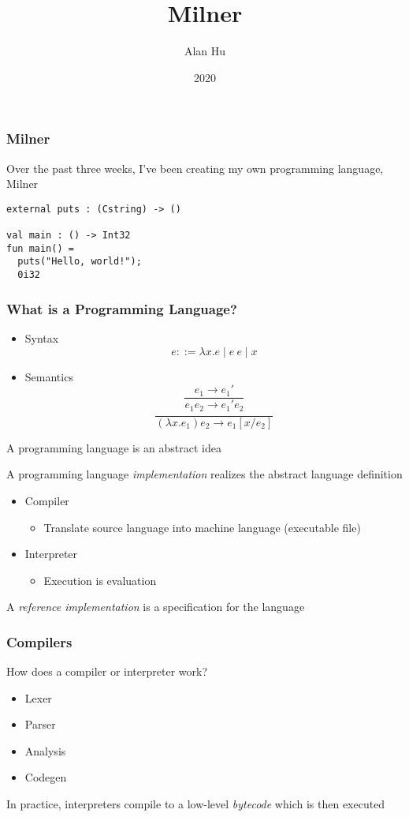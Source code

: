 \documentclass{beamer}
\title{Milner}
\author{Alan Hu}
\date{2020}
\begin{document}
\frame{\titlepage}

\begin{frame}[fragile]
  \frametitle{Milner}
  Over the past three weeks, I've been creating my own programming language,
  Milner

\begin{verbatim}
external puts : (Cstring) -> ()

val main : () -> Int32
fun main() =
  puts("Hello, world!");
  0i32
\end{verbatim}
\end{frame}

\begin{frame}
  \frametitle{What is a Programming Language?}
  \begin{itemize}
    \pause
  \item Syntax
    $$
    e ::= \lambda x.e \mid e \: e \mid x
    $$
    \pause
  \item Semantics
    $$
    \frac{e_1 \longrightarrow e_1'}{e_1 e_2 \longrightarrow e_1' e_2}
    $$
    $$
    \frac{}{(\lambda x.e_1)e_2 \longrightarrow e_1[x/e_2]}
    $$
  \end{itemize}
  \pause
  A programming language is an abstract idea
\end{frame}

\begin{frame}
  A programming language \textit{implementation} realizes the abstract language
  definition
  \begin{itemize}
    \pause
  \item Compiler
    \begin{itemize}
      \pause
      \item Translate source language into machine language (executable file)
    \end{itemize}
    \pause
  \item Interpreter
    \begin{itemize}
      \pause
    \item Execution is evaluation
    \end{itemize}
  \end{itemize}
  A \textit{reference implementation} is a specification for the language
\end{frame}

\begin{frame}
  \frametitle{Compilers}
  How does a compiler or interpreter work?
  \begin{itemize}
    \pause
  \item Lexer
    \pause
  \item Parser
    \pause
  \item Analysis
    \pause
  \item Codegen
  \end{itemize}
  \pause
  In practice, interpreters compile to a low-level \textit{bytecode} which is
  then executed
\end{frame}
\end{document}
